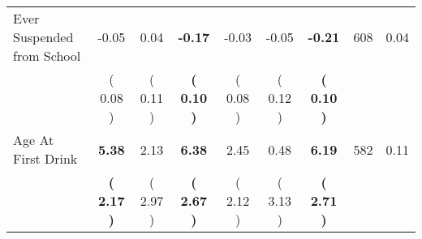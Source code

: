 \begin{tabular}{lcccccccc}
Ever Suspended from School &     -0.05 &      0.04 & \textbf{    -0.17} &     -0.03 &     -0.05 & \textbf{    -0.21} & 608 &       0.04 \\ 
 & (     0.08 ) & (     0.11 ) & \textbf{(     0.10 )} & (     0.08 ) & (     0.12 ) & \textbf{(     0.10 )} & \\
Age At First Drink & \textbf{     5.38} &      2.13 & \textbf{     6.38} &      2.45 &      0.48 & \textbf{     6.19} & 582 &       0.11 \\ 
 & \textbf{(     2.17 )} & (     2.97 ) & \textbf{(     2.67 )} & (     2.12 ) & (     3.13 ) & \textbf{(     2.71 )} & \\
\bottomrule
\end{tabular}
